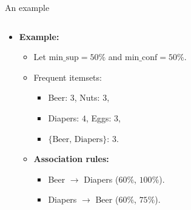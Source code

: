 \documentclass[aspectratio=169,t]{beamer}
\begin{document}
{\begin{frame}{An example}
\begin{columns}
\begin{column}{0.5\textwidth}
\begin{itemize}
            \item \textbf{Example:}
            \begin{itemize}
              \item Let $\text{min\_sup} = 50\%$ and $\text{min\_conf} = 50\%$.
              \item Frequent itemsets:
              \begin{itemize}
                \item Beer: $3$, Nuts: $3$,
                \item Diapers: $4$, Eggs: $3$,
                \item $\{\text{Beer, Diapers}\}$: $3$.
              \end{itemize}
              \item \textbf{Association rules:}
              \begin{itemize}
                \item Beer $\rightarrow$ Diapers ($60\%$, $100\%$).
                \item Diapers $\rightarrow$ Beer ($60\%$, $75\%$).
              \end{itemize}
            \end{itemize}
          \end{itemize}
          \end{column}
        \end{columns}
    \end{frame}
  }
\end{document}
